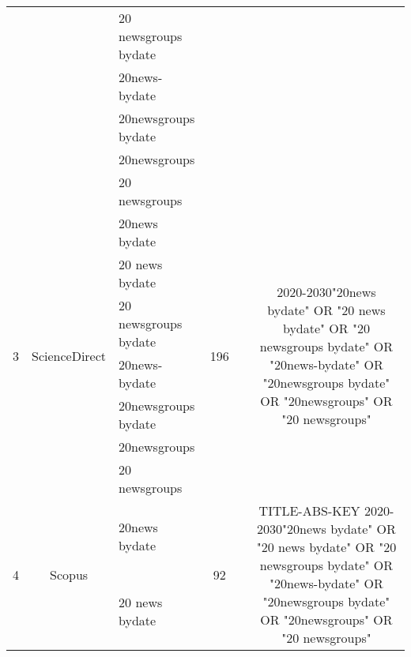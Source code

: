 \documentclass{article}
\begin{document}
\begin{table}[htbp]
\begin{tabular}{cclccccccc}
          &       & \multicolumn{1}{p{10.145em}}{20 newsgroups bydate} & \multicolumn{3}{c}{}  & \multicolumn{3}{c}{}  &  \\
          &       & \multicolumn{1}{p{10.145em}}{20news-bydate} & \multicolumn{3}{c}{}  & \multicolumn{3}{c}{}  &  \\
          &       & 20newsgroups bydate & \multicolumn{3}{c}{}  & \multicolumn{3}{c}{}  &  \\
          &       & 20newsgroups & \multicolumn{3}{c}{}  & \multicolumn{3}{c}{}  &  \\
          &       & 20 newsgroups & \multicolumn{3}{c}{}  & \multicolumn{3}{c}{}  &  \\
    \multirow{7}[0]{*}{3} & \multicolumn{1}{c}{\multirow{7}[0]{*}{ScienceDirect}} & \multicolumn{1}{p{10.145em}}{20news bydate} & \multicolumn{3}{c}{\multirow{7}[0]{*}{196}} & \multicolumn{3}{c}{}  & \multicolumn{1}{c}{\multirow{7}[0]{*}{2020-2030\newline{}"20news bydate" OR "20 news bydate" OR "20 newsgroups bydate" OR "20news-bydate" OR "20newsgroups bydate" OR "20newsgroups" OR "20 newsgroups"}} \\
          &       & \multicolumn{1}{p{10.145em}}{20 news bydate} & \multicolumn{3}{c}{}  & \multicolumn{3}{c}{}  &  \\
          &       & \multicolumn{1}{p{10.145em}}{20 newsgroups bydate} & \multicolumn{3}{c}{}  & \multicolumn{3}{c}{}  &  \\
          &       & \multicolumn{1}{p{10.145em}}{20news-bydate} & \multicolumn{3}{c}{}  & \multicolumn{3}{c}{}  &  \\
          &       & 20newsgroups bydate & \multicolumn{3}{c}{}  & \multicolumn{3}{c}{}  &  \\
          &       & 20newsgroups & \multicolumn{3}{c}{}  & \multicolumn{3}{c}{}  &  \\
          &       & 20 newsgroups & \multicolumn{3}{c}{}  & \multicolumn{3}{c}{}  &  \\
    \multirow{7}[0]{*}{4} & \multicolumn{1}{c}{\multirow{7}[0]{*}{Scopus}} & \multicolumn{1}{p{10.145em}}{20news bydate} & \multicolumn{3}{c}{\multirow{7}[0]{*}{92}} & \multicolumn{3}{c}{}  & \multicolumn{1}{c}{\multirow{7}[0]{*}{TITLE-ABS-KEY 2020-2030\newline{}"20news bydate" OR "20 news bydate" OR "20 newsgroups bydate" OR "20news-bydate" OR "20newsgroups bydate" OR "20newsgroups" OR "20 newsgroups"}} \\
          &       & \multicolumn{1}{p{10.145em}}{20 news bydate} & \multicolumn{3}{c}{}  & \multicolumn{3}{c}{}  &  \\

\end{tabular}
\end{table}
\end{document}
